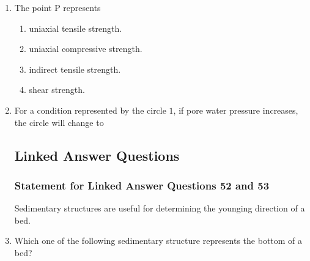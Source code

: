 \documentclass[journal,12pt,onecolumn]{IEEEtran}
\theoremstyle{remark}
\begin{document}
\begin{enumerate}
        \item The point P represents \hfill{}
            \begin{enumerate}
                \item uniaxial tensile strength.
                \item uniaxial compressive strength.
                \item indirect tensile strength.
                \item shear strength.
            \end{enumerate}

        \item For a condition represented by the circle $1$, if pore water pressure increases, the circle will change to \hfill{}
            \begin{enumerate}
            \end{enumerate}
\subsection*{Linked Answer Questions}
\subsubsection*{Statement for Linked Answer Questions 52 and 53}
Sedimentary structures are useful for determining the younging direction of a bed.

        \item Which one of the following sedimentary structure represents the bottom of a bed? \hfill{}
            \begin{enumerate}
            \end{enumerate}


\end{enumerate}
\end{document}
